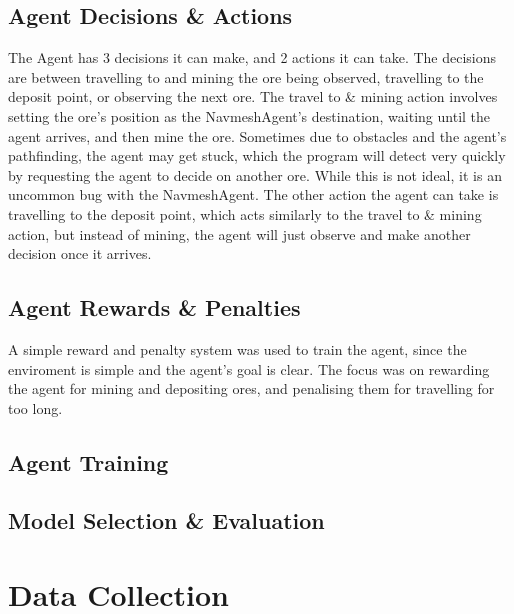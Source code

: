\begin{spacing}{2.0}
	\subsection{Agent Decisions \& Actions}

	The Agent has 3 decisions it can make, and 2 actions it can take. The decisions are between travelling to and mining the ore being observed, travelling to the deposit point, or observing the next ore.
	The travel to \& mining action involves setting the ore's position as the NavmeshAgent's destination, waiting until the agent arrives, and then mine the ore. Sometimes due to obstacles and the agent's pathfinding,
	the agent may get stuck, which the program will detect very quickly by requesting the agent to decide on another ore. While this is not ideal, it is an uncommon bug with the NavmeshAgent.
	The other action the agent can take is travelling to the deposit point, which acts similarly to the travel to \& mining action, but instead of mining, the agent will just observe and make another decision once it arrives.



	\subsection{Agent Rewards \& Penalties}

	A simple reward and penalty system was used to train the agent, since the enviroment is simple and the agent's goal is clear. The focus was on rewarding the agent for mining and depositing ores,
	and penalising them for travelling for too long.


	\subsection{Agent Training}

	\subsection{Model Selection \& Evaluation}

	\section{Data Collection}


\end{spacing}
